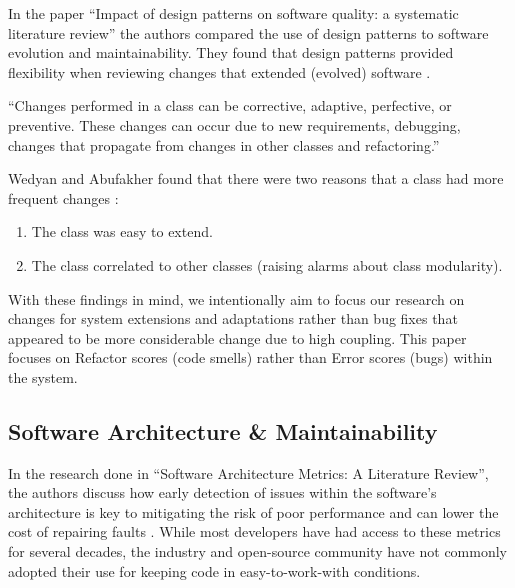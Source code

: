 In the paper ``Impact of design patterns on software quality: a systematic literature review'' the authors compared the use of design patterns to software evolution and maintainability. They found that design patterns provided flexibility when reviewing changes that extended (evolved) software \cite{wedyan:2020}.

\vspace{0.25cm}
\begin{displayquote}
  ``Changes performed in a class can be corrective, adaptive, perfective, or preventive. These changes can occur due to new requirements, debugging, changes that propagate from changes in other classes and refactoring.''
\end{displayquote}
\vspace{0.25cm}

Wedyan and Abufakher found that there were two reasons that a class had more frequent changes \cite{wedyan:2020}:

\vspace{0.25cm}
\begin{enumerate}
    \item The class was easy to extend.
    \item The class correlated to other classes (raising alarms about class modularity).
\end{enumerate}
\vspace{0.25cm}

With these findings in mind, we intentionally aim to focus our research on changes for system extensions and adaptations rather than bug fixes that appeared to be more considerable change due to high coupling. This paper focuses on Refactor scores (code smells) rather than Error scores (bugs) within the system.

\subsection{Software Architecture \& Maintainability}

In the research done in ``Software Architecture Metrics: A Literature Review'', the authors discuss how early detection of issues within the software's architecture is key to mitigating the risk of poor performance and can lower the cost of repairing faults \cite{coulin:2019}. While most developers have had access to these metrics for several decades, the industry and open-source community have not commonly adopted their use for keeping code in easy-to-work-with conditions.

